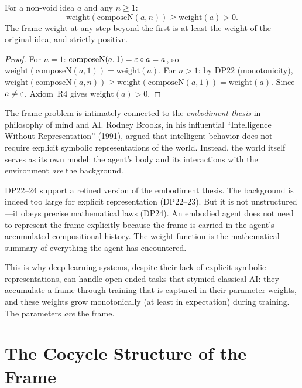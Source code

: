 \begin{theorem}
\label{thm:frame-weight-after-n}
For a non-void idea $a$ and any $n \geq 1$:
\[
\mathrm{weight}(\mathrm{composeN}(a, n)) \geq \mathrm{weight}(a) > 0.
\]
The frame weight at any step beyond the first is at least the weight of
the original idea, and strictly positive.
\end{theorem}

\begin{proof}
For $n = 1$: $\mathrm{composeN}(a, 1) = \varepsilon \circ a = a$, so
$\mathrm{weight}(\mathrm{composeN}(a, 1)) = \mathrm{weight}(a)$.
For $n > 1$: by DP22 (monotonicity), $\mathrm{weight}(\mathrm{composeN}(a, n))
\geq \mathrm{weight}(\mathrm{composeN}(a, 1)) = \mathrm{weight}(a)$.
Since $a \neq \varepsilon$, Axiom~R4 gives $\mathrm{weight}(a) > 0$.
\end{proof}

\begin{interpretation}
\label{interp:embodiment-thesis}
The frame problem is intimately connected to the \emph{embodiment thesis}
in philosophy of mind and AI.  Rodney Brooks, in his influential
``Intelligence Without Representation'' (1991), argued that intelligent
behavior does not require explicit symbolic representations of the world.
Instead, the world itself serves as its own model: the agent's body and
its interactions with the environment \emph{are} the background.

DP22--24 support a refined version of the embodiment thesis.  The
background is indeed too large for explicit representation (DP22--23).
But it is not unstructured---it obeys precise mathematical laws (DP24).
An embodied agent does not need to represent the frame explicitly
because the frame is carried in the agent's accumulated compositional
history.  The weight function is the mathematical summary of
everything the agent has encountered.

This is why deep learning systems, despite their lack of explicit
symbolic representations, can handle open-ended tasks that stymied
classical AI: they accumulate a frame through training that is
captured in their parameter weights, and these weights grow
monotonically (at least in expectation) during training.  The
parameters \emph{are} the frame.
\end{interpretation}

\section{The Cocycle Structure of the Frame}

